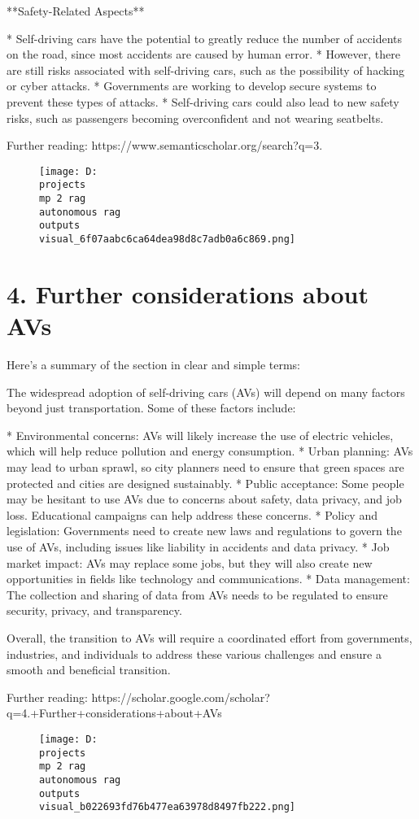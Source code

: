 \documentclass[12pt,a4paper]{article}
\begin{document}
**Safety-Related Aspects**

* Self-driving cars have the potential to greatly reduce the number of accidents on the road, since most accidents are caused by human error.
* However, there are still risks associated with self-driving cars, such as the possibility of hacking or cyber attacks.
* Governments are working to develop secure systems to prevent these types of attacks.
* Self-driving cars could also lead to new safety risks, such as passengers becoming overconfident and not wearing seatbelts.

Further reading: https://www.semanticscholar.org/search?q=3.%
\begin{figure}[h]
\centering
\texttt{[image: D:\\projects\\mp 2 rag\\autonomous rag\\outputs\\visual\_6f07aabc6ca64dea98d8c7adb0a6c869.png]}
\end{figure}
\section{4. Further considerations about AVs}
Here's a summary of the section in clear and simple terms:

The widespread adoption of self-driving cars (AVs) will depend on many factors beyond just transportation. Some of these factors include:

* Environmental concerns: AVs will likely increase the use of electric vehicles, which will help reduce pollution and energy consumption.
* Urban planning: AVs may lead to urban sprawl, so city planners need to ensure that green spaces are protected and cities are designed sustainably.
* Public acceptance: Some people may be hesitant to use AVs due to concerns about safety, data privacy, and job loss. Educational campaigns can help address these concerns.
* Policy and legislation: Governments need to create new laws and regulations to govern the use of AVs, including issues like liability in accidents and data privacy.
* Job market impact: AVs may replace some jobs, but they will also create new opportunities in fields like technology and communications.
* Data management: The collection and sharing of data from AVs needs to be regulated to ensure security, privacy, and transparency.

Overall, the transition to AVs will require a coordinated effort from governments, industries, and individuals to address these various challenges and ensure a smooth and beneficial transition.

Further reading: https://scholar.google.com/scholar?q=4.+Further+considerations+about+AVs
\begin{figure}[h]
\centering
\texttt{[image: D:\\projects\\mp 2 rag\\autonomous rag\\outputs\\visual\_b022693fd76b477ea63978d8497fb222.png]}
\end{figure}
\end{document}
